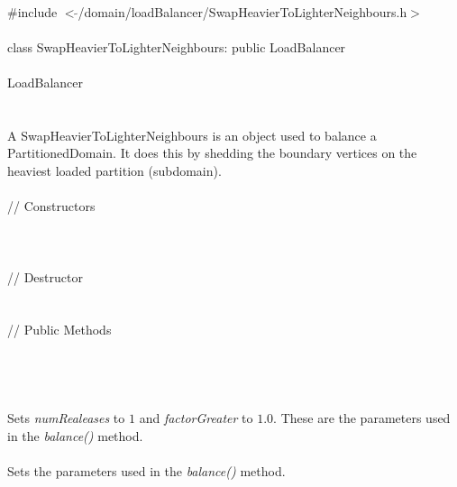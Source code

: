 
   \\
\indent \#include $<\tilde{ }$/domain/loadBalancer/SwapHeavierToLighterNeighbours.h$>$  \\

  \\
\indent class SwapHeavierToLighterNeighbours: public LoadBalancer \\

 \\
\indent  LoadBalancer \\
\indent{} \\


  \\
\indent A SwapHeavierToLighterNeighbours is an object used to balance a
PartitionedDomain. It does this by shedding the boundary vertices on
the heaviest loaded partition (subdomain). \\

  \\
\indent\indent  // Constructors  \\
\indent{}\\ 
\indent{} \\ \\
\indent\indent // Destructor  \\
\indent{}  \\ \\
\indent\indent // Public Methods  \\
\indent{} \\ \\


\\
\\ 
Sets {\em numRealeases} to $1$ and {\em factorGreater} to $1.0$. These
are the parameters used in the {\em balance()} method. \\

\\ 
Sets the parameters used in the {\em balance()} method. \\

